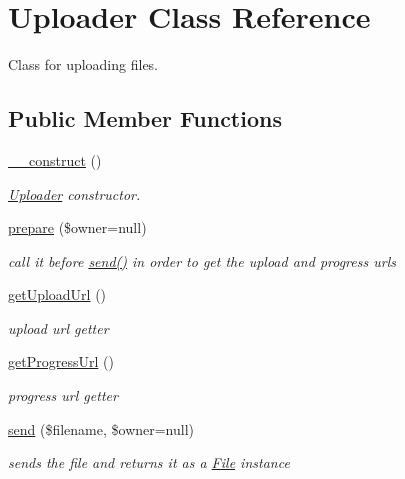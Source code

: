 \hypertarget{classUploader}{
\section{Uploader Class Reference}
\label{classUploader}
}


Class for uploading files.  


\subsection*{Public Member Functions}
\begin{DoxyCompactItemize}
\item 
\hypertarget{classUploader_a60c2d30006a87612fb93977b58d5ba89}{
\hyperlink{classUploader_a60c2d30006a87612fb93977b58d5ba89}{\_\-\_\-construct} ()}
\label{classUploader_a60c2d30006a87612fb93977b58d5ba89}

\begin{DoxyCompactList}\small\item\em \hyperlink{classUploader}{Uploader} constructor. \end{DoxyCompactList}\item 
\hypertarget{classUploader_ad89a94d5f36bdeadd4e97d1114f2dd3b}{
\hyperlink{classUploader_ad89a94d5f36bdeadd4e97d1114f2dd3b}{prepare} (\$owner=null)}
\label{classUploader_ad89a94d5f36bdeadd4e97d1114f2dd3b}

\begin{DoxyCompactList}\small\item\em call it before \hyperlink{classUploader_af16f57142f7a015461a51f26cd786f5d}{send()} in order to get the upload and progress urls \end{DoxyCompactList}\item 
\hypertarget{classUploader_aa1d13a8f40e54cb73fa3d5cd12d4794d}{
\hyperlink{classUploader_aa1d13a8f40e54cb73fa3d5cd12d4794d}{getUploadUrl} ()}
\label{classUploader_aa1d13a8f40e54cb73fa3d5cd12d4794d}

\begin{DoxyCompactList}\small\item\em upload url getter \end{DoxyCompactList}\item 
\hypertarget{classUploader_ab908cff6cbdf2b5af26da7815e3f3a13}{
\hyperlink{classUploader_ab908cff6cbdf2b5af26da7815e3f3a13}{getProgressUrl} ()}
\label{classUploader_ab908cff6cbdf2b5af26da7815e3f3a13}

\begin{DoxyCompactList}\small\item\em progress url getter \end{DoxyCompactList}\item 
\hypertarget{classUploader_af16f57142f7a015461a51f26cd786f5d}{
\hyperlink{classUploader_af16f57142f7a015461a51f26cd786f5d}{send} (\$filename, \$owner=null)}
\label{classUploader_af16f57142f7a015461a51f26cd786f5d}

\begin{DoxyCompactList}\small\item\em sends the file and returns it as a \hyperlink{classFile}{File} instance \end{DoxyCompactList}\end{DoxyCompactItemize}


